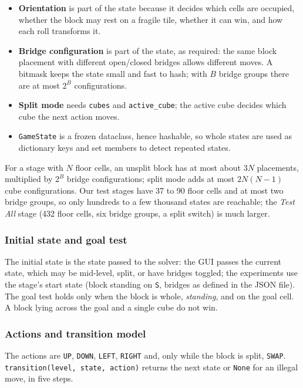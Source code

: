 \begin{itemize}[leftmargin=*]
\item \textbf{Orientation} is part of the state because it decides which cells are occupied,
whether the block may rest on a fragile tile, whether it can win, and how each roll transforms it.
\item \textbf{Bridge configuration} is part of the state, as required: the same block placement
with different open/closed bridges allows different moves. A bitmask keeps the state small and
fast to hash; with $B$ bridge groups there are at most $2^B$ configurations.
\item \textbf{Split mode} needs \texttt{cubes} and \texttt{active\_cube}; the active cube decides
which cube the next action moves.
\item \texttt{GameState} is a frozen dataclass, hence hashable, so whole states are used as
dictionary keys and set members to detect repeated states.
\end{itemize}

For a stage with $N$ floor cells, an unsplit block has at most about $3N$ placements, multiplied
by $2^B$ bridge configurations; split mode adds at most $2N(N-1)$ cube configurations. Our test
stages have 37 to 90 floor cells and at most two bridge groups, so only hundreds to a few thousand
states are reachable; the \emph{Test All} stage (432 floor cells, six bridge groups, a split
switch) is much larger.

\subsubsection{Initial state and goal test}

The initial state is the state passed to the solver: the GUI passes the current state, which may
be mid-level, split, or have bridges toggled; the experiments use the stage's start state (block
standing on \texttt{S}, bridges as defined in the JSON file). The goal test holds only when the
block is whole, \emph{standing}, and on the goal cell. A block lying across the goal and a single
cube do not win.

\subsubsection{Actions and transition model}

The actions are \texttt{UP}, \texttt{DOWN}, \texttt{LEFT}, \texttt{RIGHT} and, only while the
block is split, \texttt{SWAP}. \texttt{transition(level, state, action)} returns the next state
or \texttt{None} for an illegal move, in five steps.

